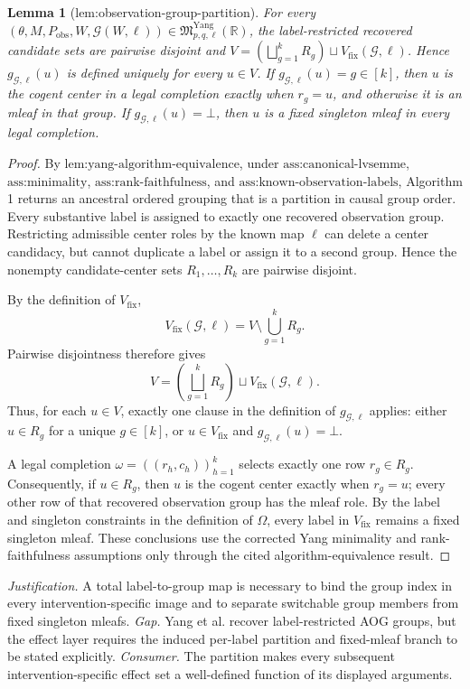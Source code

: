 \documentclass{article}
\newtheorem{lemma}{Lemma}
\begin{document}
\begin{lemma}[lem:observation-group-partition]\label{lem:observation-group-partition}
For every \((\theta,M,P_{\mathrm{obs}},W,\mathcal G(W,\ell))\in\mathfrak M_{p,q,\ell}^{\mathrm{Yang}}(\mathbb R)\), the label-restricted recovered candidate sets are pairwise disjoint and \(V=(\bigsqcup_{g=1}^{k}R_g)\sqcup V_{\mathrm{fix}}(\mathcal G,\ell)\). Hence \(g_{\mathcal G,\ell}(u)\) is defined uniquely for every \(u\in V\). If \(g_{\mathcal G,\ell}(u)=g\in[k]\), then \(u\) is the cogent center in a legal completion exactly when \(r_g=u\), and otherwise it is an mleaf in that group. If \(g_{\mathcal G,\ell}(u)=\bot\), then \(u\) is a fixed singleton mleaf in every legal completion.
\end{lemma}
\begin{proof}
By \(\text{lem:yang-algorithm-equivalence}\), under \(\text{ass:canonical-lvsemme}\), \(\text{ass:minimality}\), \(\text{ass:rank-faithfulness}\), and \(\text{ass:known-observation-labels}\), Algorithm 1 returns an ancestral ordered grouping that is a partition in causal group order. Every substantive label is assigned to exactly one recovered observation group. Restricting admissible center roles by the known map \(\ell\) can delete a center candidacy, but cannot duplicate a label or assign it to a second group. Hence the nonempty candidate-center sets \(R_1,\ldots,R_k\) are pairwise disjoint.

By the definition of \(V_{\mathrm{fix}}\),
\[
V_{\mathrm{fix}}(\mathcal G,\ell)=V\setminus\bigcup_{g=1}^{k}R_g.
\]
Pairwise disjointness therefore gives
\[
V=\left(\bigsqcup_{g=1}^{k}R_g\right)\sqcup V_{\mathrm{fix}}(\mathcal G,\ell).
\]
Thus, for each \(u\in V\), exactly one clause in the definition of \(g_{\mathcal G,\ell}\) applies: either \(u\in R_g\) for a unique \(g\in[k]\), or \(u\in V_{\mathrm{fix}}\) and \(g_{\mathcal G,\ell}(u)=\bot\).

A legal completion \(\omega=((r_h,c_h))_{h=1}^{k}\) selects exactly one row \(r_g\in R_g\). Consequently, if \(u\in R_g\), then \(u\) is the cogent center exactly when \(r_g=u\); every other row of that recovered observation group has the mleaf role. By the label and singleton constraints in the definition of \(\Omega\), every label in \(V_{\mathrm{fix}}\) remains a fixed singleton mleaf. These conclusions use the corrected Yang minimality and rank-faithfulness assumptions only through the cited algorithm-equivalence result.
\end{proof}
\par\smallskip\noindent \textit{Justification.} A total label-to-group map is necessary to bind the group index in every intervention-specific image and to separate switchable group members from fixed singleton mleafs. \textit{Gap.} Yang et al. recover label-restricted AOG groups, but the effect layer requires the induced per-label partition and fixed-mleaf branch to be stated explicitly. \textit{Consumer.} The partition makes every subsequent intervention-specific effect set a well-defined function of its displayed arguments.
\end{document}
